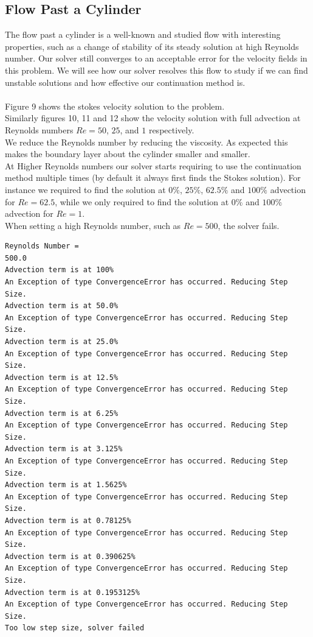 \documentclass[11pt,twoside,a4paper]{article}
\begin{document}
\subsection{Flow Past a Cylinder}

The flow past a cylinder is a well-known and studied flow with interesting properties, such as a change of stability of its steady solution at high Reynolds number.
Our solver still converges to an acceptable error for the velocity fields in this problem.
We will see how our solver resolves this flow to study if we can find unstable solutions and how effective our continuation method is.\\
\\
Figure 9 shows the stokes velocity solution to the problem.\\
Similarly figures 10, 11 and 12 show the velocity solution with full advection at Reynolds numbers $Re = 50$, $25$, and $1$ respectively.\\
We reduce the Reynolds number by reducing the viscosity. As expected this makes the boundary layer about the cylinder smaller and smaller.\\
At Higher Reynolds numbers our solver starts requiring to use the continuation method multiple times (by default it always first finds the Stokes solution). For instance we required to find the solution at $0 \%$, $25 \%$, $62.5\%$ and $100\%$ advection for $Re =62.5$, while we only required to find the solution at $0 \%$ and $100 \%$ advection for $Re = 1$.\\
When setting a high Reynolds number, such as $Re = 500$, the solver fails.
\begin{lstlisting}
Reynolds Number =
500.0
Advection term is at 100%
An Exception of type ConvergenceError has occurred. Reducing Step Size.
Advection term is at 50.0%
An Exception of type ConvergenceError has occurred. Reducing Step Size.
Advection term is at 25.0%
An Exception of type ConvergenceError has occurred. Reducing Step Size.
Advection term is at 12.5%
An Exception of type ConvergenceError has occurred. Reducing Step Size.
Advection term is at 6.25%
An Exception of type ConvergenceError has occurred. Reducing Step Size.
Advection term is at 3.125%
An Exception of type ConvergenceError has occurred. Reducing Step Size.
Advection term is at 1.5625%
An Exception of type ConvergenceError has occurred. Reducing Step Size.
Advection term is at 0.78125%
An Exception of type ConvergenceError has occurred. Reducing Step Size.
Advection term is at 0.390625%
An Exception of type ConvergenceError has occurred. Reducing Step Size.
Advection term is at 0.1953125%
An Exception of type ConvergenceError has occurred. Reducing Step Size.
Too low step size, solver failed
\end{lstlisting}
\end{document}
